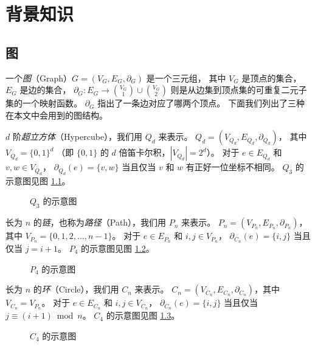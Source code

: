 
\chapter{背景知识}
\label{Chapter 2}

\section{图}
\label{Section 2.1}

一个\emph{图}（Graph）$G = (V_G, E_G, \partial_G)$ 是一个三元组，
其中 $V_G$ 是顶点的集合，$E_G$ 是边的集合，
$\partial_G \colon E_G \rightarrow \binom{V_G}{1} \cup \binom{V_G}{2}$
则是从边集到顶点集的可重复二元子集的一个映射函数。
$\partial_G$ 指出了一条边对应了哪两个顶点。
下面我们列出了三种在本文中会用到的图结构。

$d$ 阶\emph{超立方体}（Hypercube），我们用 $Q_d$ 来表示。
$Q_d = (V_{Q_d}, E_{Q_d}, \partial_{Q_d})$，
其中 $V_{Q_d} = \{0, 1\}^d$
（即 $\{0, 1\}$ 的 $d$ 倍笛卡尔积，$|V_{Q_d}| = 2^d$）。
对于 $e \in E_{Q_d}$ 和 $v, w \in V_{Q_d}$，
$\partial_{Q_d}(e) = \{v, w\}$ 当且仅当 $v$ 和 $w$ 有正好一位坐标不相同。
$Q_3$ 的示意图见图 \ref{Figure 2-1}。

\begin{figure}[h!]
	\centering
	
	\caption{$Q_3$ 的示意图}
	\label{Figure 2-1}
\end{figure}

长为 $n$ 的\emph{链}，也称为\emph{路径}（Path），我们用 $P_n$ 来表示。
$P_n = (V_{P_n}, E_{P_n}, \partial_{P_n})$，
其中 $V_{P_n} = \{0, 1, 2, \dots, n - 1\}$。
对于 $e \in E_{P_n}$ 和 $i, j \in V_{P_n}$，
$\partial_{C_n}(e) = \{i, j\}$ 当且仅当 $j = i + 1$。
$P_4$ 的示意图见图 \ref{Figure 2-2}。

\begin{figure}[h!]
	\centering
	
	\caption{$P_4$ 的示意图}
	\label{Figure 2-2}
\end{figure}

长为 $n$ 的\emph{环}（Circle），我们用 $C_n$ 来表示。
$C_n = (V_{C_n}, E_{C_n}, \partial_{C_n})$，其中 $V_{C_n} = V_{P_n}$。
对于 $e \in E_{C_n}$ 和 $i, j \in V_{C_n}$，
$\partial_{C_n}(e) = \{i, j\}$ 当且仅当 $j \equiv (i + 1) \bmod n$。
$C_4$ 的示意图见图 \ref{Figure 2-3}。

\begin{figure}[h!]
	\centering
	
	\caption{$C_4$ 的示意图}
	\label{Figure 2-3}
\end{figure}

